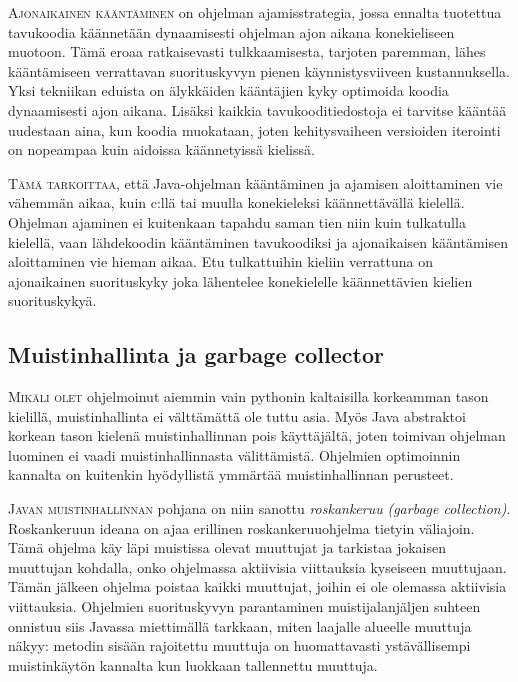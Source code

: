 \documentclass[openany]{book}
\newcommand{\newthought}[1]{\smallskip\textsc{#1}}
\newcommand{\eng}[1]{\textit{(#1)}}
\newcommand{\new}[1]{\textit{\gls{#1}}}
\newcommand{\neweng}[2]{\new{#1} \eng{#2}}
\begin{document}
\newthought{Ajonaikainen kääntäminen} on ohjelman ajamisstrategia, jossa ennalta tuotettua
tavukoodia käännetään dynaamisesti ohjelman ajon aikana konekieliseen muotoon. Tämä eroaa
ratkaisevasti tulkkaamisesta, tarjoten paremman, lähes kääntämiseen verrattavan suorituskyvyn
pienen käynnistysviiveen kustannuksella. Yksi tekniikan eduista on älykkäiden kääntäjien kyky
optimoida koodia dynaamisesti ajon aikana. Lisäksi kaikkia tavukooditiedostoja ei tarvitse kääntää
uudestaan aina, kun koodia muokataan, joten kehitysvaiheen versioiden iterointi on nopeampaa kuin
aidoissa käännetyissä kielissä.

\newthought{Tämä tarkoittaa}, että Java-ohjelman kääntäminen ja ajamisen aloittaminen vie vähemmän
aikaa, kuin c:llä tai muulla konekieleksi käännettävällä kielellä. Ohjelman ajaminen ei kuitenkaan
tapahdu saman tien niin kuin tulkatulla kielellä, vaan lähdekoodin kääntäminen tavukoodiksi ja
ajonaikaisen kääntämisen aloittaminen vie hieman aikaa. Etu tulkattuihin kieliin verrattuna on
ajonaikainen suorituskyky joka lähentelee konekielelle käännettävien kielien suorituskykyä.

\subsection{Muistinhallinta ja garbage collector}
\label{GC}

\newthought{Mikäli olet} ohjelmoinut aiemmin vain pythonin kaltaisilla korkeamman tason kielillä,
muistinhallinta ei välttämättä ole tuttu asia. Myös Java abstraktoi korkean tason kielenä
muistinhallinnan pois käyttäjältä, joten toimivan ohjelman luominen ei vaadi muistinhallinnasta
välittämistä. Ohjelmien optimoinnin kannalta on kuitenkin hyödyllistä ymmärtää muistinhallinnan
perusteet.

\newthought{Javan muistinhallinnan} pohjana on niin sanottu
\neweng{roskankeruu}{garbage collection}. Roskankeruun ideana on ajaa erillinen roskankeruuohjelma
tietyin väliajoin. Tämä ohjelma käy läpi muistissa olevat muuttujat ja tarkistaa jokaisen
muuttujan kohdalla, onko ohjelmassa aktiivisia viittauksia kyseiseen muuttujaan. Tämän jälkeen
ohjelma poistaa kaikki muuttujat, joihin ei ole olemassa aktiivisia viittauksia. Ohjelmien
suorituskyvyn parantaminen muistijalanjäljen suhteen onnistuu siis Javassa miettimällä tarkkaan,
miten laajalle alueelle muuttuja näkyy: metodin sisään rajoitettu muuttuja on huomattavasti
ystävällisempi muistinkäytön kannalta kun luokkaan tallennettu muuttuja.

\end{document}
